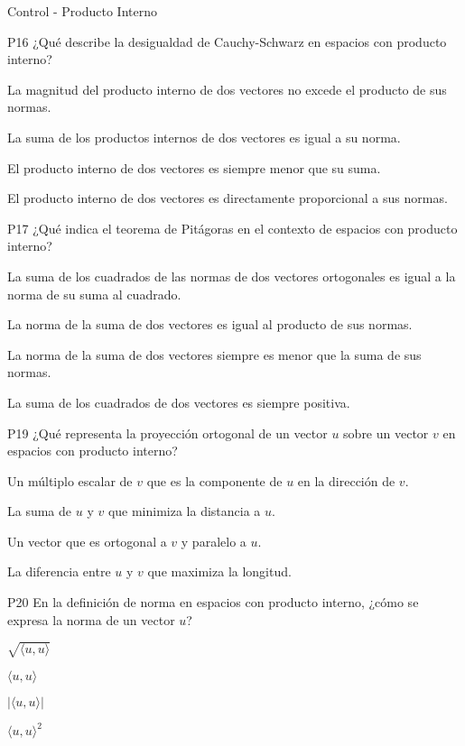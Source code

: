 \documentclass[a4,11pt]{aleph-notas}
\begin{document}
\begin{quiz}{Control - Producto Interno}
\begin{multi}[]%
    {P16}     
    ¿Qué describe la desigualdad de Cauchy-Schwarz en espacios con producto interno?     
    \item* La magnitud del producto interno de dos vectores no excede el producto de sus normas.     
    \item La suma de los productos internos de dos vectores es igual a su norma.     
    \item El producto interno de dos vectores es siempre menor que su suma.     
    \item El producto interno de dos vectores es directamente proporcional a sus normas. 
\end{multi}

\begin{multi}[]%
    {P17}     
    ¿Qué indica el teorema de Pitágoras en el contexto de espacios con producto interno?     
    \item* La suma de los cuadrados de las normas de dos vectores ortogonales es igual a la norma de su suma al cuadrado.     
    \item La norma de la suma de dos vectores es igual al producto de sus normas.     
    \item La norma de la suma de dos vectores siempre es menor que la suma de sus normas.     
    \item La suma de los cuadrados de dos vectores es siempre positiva. 
\end{multi}


\begin{multi}[]%
    {P19}     
    ¿Qué representa la proyección ortogonal de un vector \(u\) sobre un vector \(v\) en espacios con producto interno?     
    \item* Un múltiplo escalar de \(v\) que es la componente de \(u\) en la dirección de \(v\).     
    \item La suma de \(u\) y \(v\) que minimiza la distancia a \(u\).     
    \item Un vector que es ortogonal a \(v\) y paralelo a \(u\).     
    \item La diferencia entre \(u\) y \(v\) que maximiza la longitud. 
\end{multi}

\begin{multi}[]%
    {P20}     
    En la definición de norma en espacios con producto interno, ¿cómo se expresa la norma de un vector \(u\)?     
    \item* \(\sqrt{\langle u, u \rangle}\)     
    \item \(\langle u, u \rangle\)     
    \item \(|\langle u, u \rangle|\)     
    \item \(\langle u, u \rangle^2\) 
\end{multi}


\end{quiz}
\end{document}
